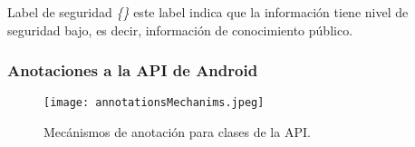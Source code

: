 Label de seguridad \emph{\{\}}\newline
este label indica que la información tiene nivel de seguridad bajo, es decir,
información de conocimiento público.

\subsubsection{Anotaciones a la API de Android}

\begin{figure}[h!]
	\begin{center}
	\texttt{[image: annotationsMechanims.jpeg]}
	\end{center}
	\caption{Mecánismos de anotación para clases de la API.}
	\label{fig:annotationsMechanims}
\end{figure}

